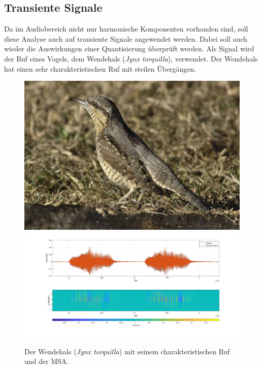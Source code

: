 \begin{refsection}
\subsection{Transiente Signale}
Da im Audiobereich nicht nur harmonische Komponenten vorhanden sind, soll diese Analyse auch auf transiente Signale angewendet werden.
Dabei soll auch wieder die Auswirkungen einer Quantisierung überprüft werden.
Als Signal wird der Ruf eines Vogels, dem Wendehals (\textit{Jynx torquilla}), verwendet.
Der Wendehals hat einen sehr charakteristischen Ruf mit steilen Übergängen.
\begin{figure}
	\includegraphics[width=0.4\linewidth]{papers/compress/Bilder/wendehals.jpg}
	\includegraphics[width=0.6\linewidth]{papers/compress/Bilder/jynxAll.pdf}
	\caption{Der Wendehals (\textit{Jynx torquilla}) \cite{wikipedia:wendehals} mit seinem charakteristischen Ruf und der MSA.}
	\label{fig:jynxAll}
\end{figure}


\end{refsection}
